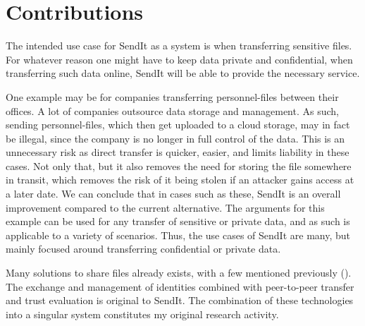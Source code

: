 \section{Contributions}
%
The intended use case for SendIt as a system is when transferring sensitive files. For whatever reason one might have to keep data private and confidential, when transferring such data online, SendIt will be able to provide the necessary service.

One example may be for companies transferring personnel-files between their offices. A lot of companies outsource data storage and management. As such, sending personnel-files, which then get uploaded to a cloud storage, may in fact be illegal, since the company is no longer in full control of the data. This is an unnecessary risk as direct transfer is quicker, easier, and limits liability in these cases. Not only that, but it also removes the need for storing the file somewhere in transit, which removes the risk of it being stolen if an attacker gains access at a later date. We can conclude that in cases such as these, SendIt is an overall improvement compared to the current alternative. The arguments for this example can be used for any transfer of sensitive or private data, and as such is applicable to a variety of scenarios. Thus, the use cases of SendIt are many, but mainly focused around transferring confidential or private data.

Many solutions to share files already exists, with a few mentioned previously (). The exchange and management of identities combined with peer-to-peer transfer and trust evaluation is original to SendIt. The combination of these technologies into a singular system constitutes my original research activity. 
